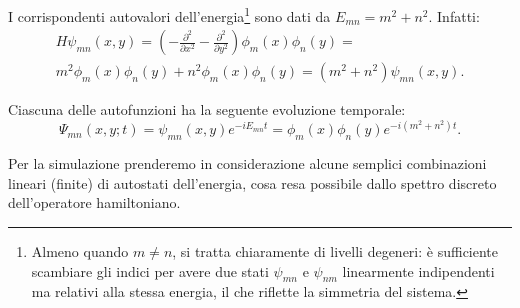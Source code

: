 I corrispondenti autovalori dell'energia\footnote{
  Almeno quando $m\not=n$, si tratta chiaramente di livelli
  degeneri: è sufficiente scambiare gli indici per avere due stati
  $\psi_{mn}$ e $\psi_{nm}$ linearmente indipendenti ma relativi alla
  stessa energia, il che riflette la simmetria del sistema.
} sono dati da $E_{mn}=m^2+n^2$. 
Infatti:
\begin{multline*} H\psi_{mn}(x,y) = 
\left(-\frac{\partial^2}{\partial x^2}-\frac{\partial^2}{\partial y^2}\right)
\phi_m(x)\phi_n(y) = \\
m^2\phi_m(x)\phi_n(y) + n^2\phi_m(x)\phi_n(y) = (m^2+n^2)\psi_{mn}(x,y).
\end{multline*}

Ciascuna delle autofunzioni ha la seguente evoluzione temporale:
\begin{equation}
\Psi_{mn}(x,y;t) = \psi_{mn}(x,y) e^{-iE_{mn}t} 
= \phi_{m}(x) \phi_{n}(y) e^{-i(m^2+n^2)t} . \label{eq:evol_autofunzioni}
\end{equation} 

Per la simulazione prenderemo in considerazione alcune semplici combinazioni
lineari (finite) di autostati dell'energia, cosa resa possibile dallo
spettro discreto dell'operatore hamiltoniano.


